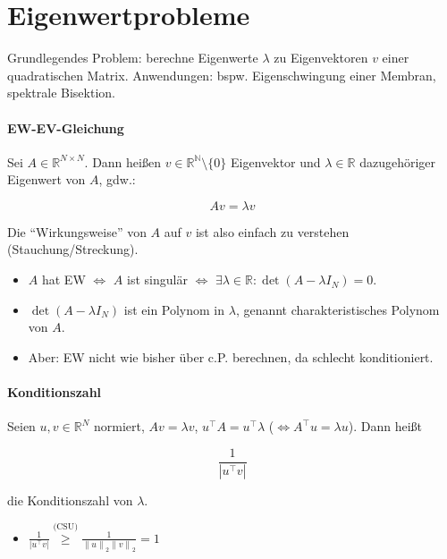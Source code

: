 \documentclass[a4paper, 14pt]{article}
\newcommand{\norm}[1]{\left\lVert#1\right\rVert}
\begin{document}
	\section{Eigenwertprobleme}

	Grundlegendes Problem: berechne Eigenwerte $\lambda$ zu Eigenvektoren $v$ einer quadratischen Matrix.
	Anwendungen: bspw. Eigenschwingung einer Membran, spektrale Bisektion.

	\paragraph{EW-EV-Gleichung}

	Sei $A \in \mathbb{R}^{N \times N}$. Dann heißen $v \in \mathbb{R^N} \setminus \{ 0 \}$ Eigenvektor und $\lambda \in \mathbb{R}$ dazugehöriger Eigenwert von $A$, gdw.:

	\begin{equation}
		A v = \lambda v
	\end{equation}

	Die \enquote{Wirkungsweise} von $A$ auf $v$ ist also einfach zu verstehen (Stauchung/Streckung).

	\begin{itemize}
		\item $A$ hat EW $\Leftrightarrow$ $A$ ist singulär $\Leftrightarrow$ $\exists \lambda \in \mathbb{R} : \det(A - \lambda I_N) = 0$.
		\item $\det(A - \lambda I_N)$ ist ein Polynom in $\lambda$, genannt charakteristisches Polynom von $A$.
		\item Aber: EW nicht wie bisher über c.P. berechnen, da schlecht konditioniert.
	\end{itemize}

	\paragraph{Konditionszahl}

	Seien $u, v \in \mathbb{R}^N$ normiert, $A v = \lambda v$, $u^\top A = u^\top \lambda$ ($\Leftrightarrow A^\top u = \lambda u$).
	Dann heißt

	\begin{equation}
		\frac{1}{|u^{\top} v|}
	\end{equation}

	die Konditionszahl von $\lambda$.

	\begin{itemize}
		\item $\frac{1}{|u^{\top} v|} \stackrel{\textrm{(CSU)}}{\geq} \frac{1}{\norm{u}_2 \norm{v}_2} = 1$
	\end{itemize}
\end{document}
